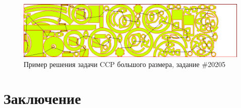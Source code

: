 \documentclass[10pt]{SPIIRAS_Proceedings}
\begin{document}
\begin{figure}
  \begin{center}
    \includegraphics[angle=90,height=0.8\textheight]{test5-ccp.png}
  \end{center}
  \caption{Пример решения задачи CCP большого размера, задание \#20205}
  \label{large-path}
\end{figure}

\section{Заключение}
\label{sec:conclude}
\end{document}
